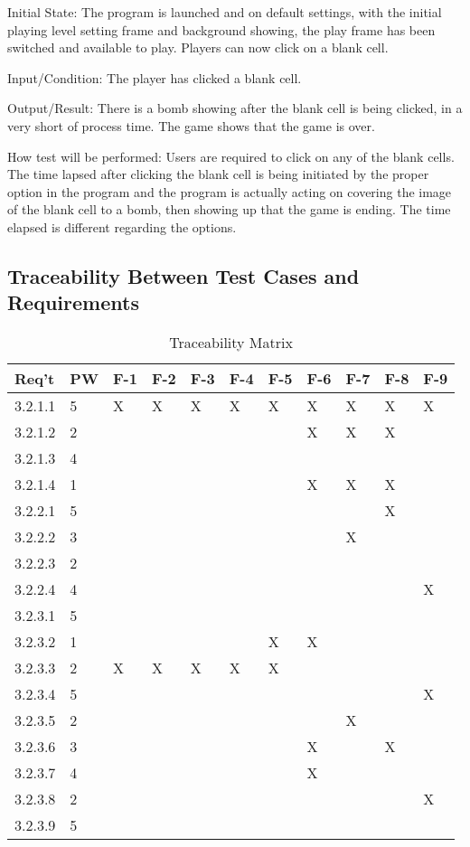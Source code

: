 \documentclass[12pt, titlepage]{article}
\begin{document}
\begin{enumerate}
Initial State: The program is launched and on default settings, with the initial playing level setting frame and background showing, the play frame has been switched and available to play. Players can now click on a blank cell.

Input/Condition: The player has clicked a blank cell.

Output/Result: There is a bomb showing after the blank cell is being clicked, in a very short of process time. The game shows that the game is over.

How test will be performed: Users are required to click on any of the blank cells. The time lapsed after clicking the blank cell is being initiated by the proper option in the program and the program is actually acting on covering the image of the blank cell to a bomb, then showing up that the game is ending. The time elapsed is different regarding the options.

\end{enumerate}
\newpage
\subsection{Traceability Between Test Cases and Requirements}
\begin{table}[h!]
    \caption{Traceability Matrix}
    \begin{center}
	\begin{tabular}{|p{1.5cm}|p{1.0cm}|p{1.0cm}p{1.0cm}p{1.0cm}p{1.0cm}p{1.0cm}p{1.0cm}p{1.0cm}p{1.0cm}p{1.0cm}|}
	\hline
	\textbf{Req't} & \textbf{PW} & \textbf{F-1} & \textbf{F-2} & \textbf{F-3} & \textbf{F-4} & \textbf{F-5} & \textbf{F-6} & \textbf{F-7} & \textbf{F-8} & \textbf{F-9}\\
	\hline
	\hline
      3.2.1.1 & 5 & X & X & X & X & X & X & X &X&X\\
      3.2.1.2 & 2 &   & &   & & & X   &X &X&\\
      3.2.1.3 &4  &  & &  & && &  &  &\\
      3.2.1.4 &1&   & &   & & & X   &X &X&\\
      3.2.2.1 &5&   & &   & & &    & &X&\\
      3.2.2.2 &3&&&&&&&X&&\\
      3.2.2.3 &2&&&&&&&&&\\
      3.2.2.4 &4&&&&&&&&&X\\
      3.2.3.1 &5&&&&&&&&&\\
      3.2.3.2 &1&&&&&X&X&&&\\
      3.2.3.3 &2&X&X&X&X&X&&&&\\
      3.2.3.4 &5&&&&&&&&&X\\
      3.2.3.5 &2&&&&&&&X&&\\
      3.2.3.6 &3&&&&&&X&&X&\\
      3.2.3.7 &4&&&&&&X&&&\\
      3.2.3.8 &2&&&&&&&&&X\\
      3.2.3.9 &5&&&&&&&&&\\
      \hline
	\end{tabular}
    \end{center}
	\end{table}
	\newpage
	
\end{document}
